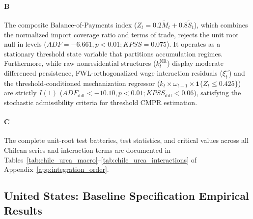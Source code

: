 \paragraph{B}
The composite Balance-of-Payments index ($Z_t = 0.2 \tilde{M}_t + 0.8 \tilde{S}_t$), which combines the normalized import coverage ratio and terms of trade, rejects the unit root null in levels ($ADF = -6.661, p < 0.01; KPSS = 0.075$). It operates as a stationary threshold state variable that partitions accumulation regimes. Furthermore, while raw nonresidential structures ($k^{\text{NR}}_t$) display moderate differenced persistence, FWL-orthogonalized wage interaction residuals ($\xi^{\omega}_t$) and the threshold-conditioned mechanization regressor ($k_t \times \omega_{t-1} \times \mathbf{1}\{Z_t \le 0.425\}$) are strictly $I(1)$ ($ADF_{\text{diff}} < -10.10, p < 0.01; KPSS_{\text{diff}} < 0.06$), satisfying the stochastic admissibility criteria for threshold CMPR estimation.

\paragraph{C}
The complete unit-root test batteries, test statistics, and critical values across all Chilean series and interaction terms are documented in Tables~\ref{tab:chile_urca_macro}--\ref{tab:chile_urca_interactions} of Appendix~\ref{app:integration_order}.




\subsection{United States: Baseline Specification Empirical Results}
\label{sec:431:specA_results}

